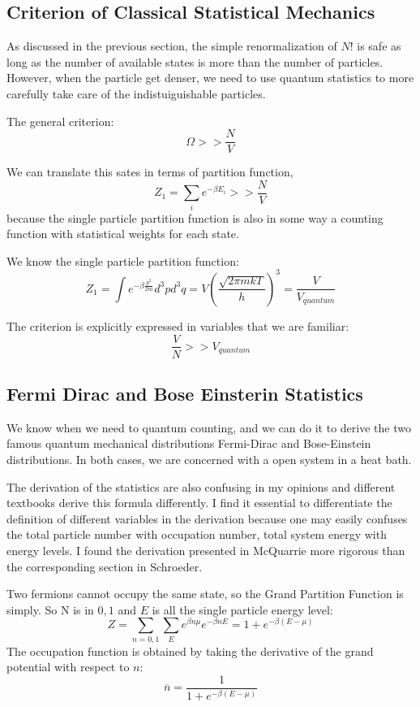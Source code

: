\documentclass[12pt, oneside]{article}   	%
\begin{document}
\subsection{Criterion of Classical Statistical Mechanics}
\par
As discussed in the previous section, the simple renormalization of $N!$ is safe as long as the number of available states is more than the number of particles. However, when the particle get denser, we need to use quantum statistics to more carefully take care of the indistuiguishable particles. 
\par
The general criterion: 
$$\Omega >> \frac{N}{V}$$
\par
We can translate this sates in terms of partition function,
$$Z_1 = \sum_i e^{-\beta E_i}>> \frac{N}{V}$$
because the single particle partition function is also in some way a counting function with statistical weights for each state. 
\par
We know the single particle partition function: 
$$Z_1 = \int e^{-\beta \frac{p^2}{2m}} d^3 p d^3 q = V (\frac{\sqrt{2 \pi m k T}}{h} )^3 = \frac{V}{V_{quantum}}$$
\par
The criterion is explicitly expressed in variables that we are familiar: 
$$\frac{V}{N} >> V_{quantum}$$

\subsection{Fermi Dirac and Bose Einsterin Statistics}
\par
We know when we need to quantum counting, and we can do it to derive the two famous quantum mechanical distributions Fermi-Dirac and Bose-Einstein distributions. In both cases, we are concerned with a open system in a heat bath. 
\par
The derivation of the statistics are also confusing in my opinions and different textbooks derive this formula differently. I find it essential to differentiate the definition of different variables in the derivation because one may easily confuses the total particle number with occupation number, total system energy with energy levels. I found the derivation presented in McQuarrie more rigorous than the corresponding section in Schroeder. 
\par 
Two fermions cannot occupy the same state, so the Grand Partition Function is simply. So N is in ${0,1}$ and $E$ is all the single particle energy level: 
$$Z = \sum_{n = 0,1} \sum_{E} e^{\beta n \mu} e^{-\beta n E} = 1 + e^{-\beta (E - \mu)}$$
The occupation function is obtained by taking the derivative of the grand potential with respect to $n$:
$$\overline{n} = \frac{1}{1+ e^{-\beta(E-\mu)}} $$ 
\end{document}
